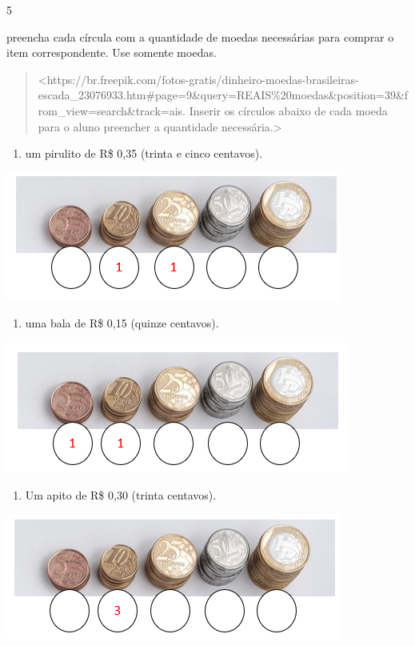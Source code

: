 \num{5}

preencha cada círcula com a quantidade de moedas necessárias para comprar o item correspondente. Use somente moedas.

\begin{quote}
\textless{}https://br.freepik.com/fotos-gratis/dinheiro-moedas-brasileiras-escada\_23076933.htm\#page=9\&query=REAIS\%20moedas\&position=39\&from\_view=search\&track=ais.
Inserir os círculos abaixo de cada moeda para o aluno preencher a
quantidade necessária.\textgreater{}
\end{quote}

\begin{enumerate}
\def\labelenumi{\Alph{enumi})}
\item
  um pirulito de R\$ 0,35 (trinta e cinco centavos).
\end{enumerate}

\includegraphics[width=4.34436in,height=1.66690in]{media/image71.png}

\begin{enumerate}
\def\labelenumi{\Alph{enumi})}
\item
  uma bala de R\$ 0,15 (quinze centavos).
\end{enumerate}

\includegraphics[width=4.41728in,height=1.68774in]{media/image72.png}

\begin{enumerate}
\def\labelenumi{\Alph{enumi})}
\item
  Um apito de R\$ 0,30 (trinta centavos).
\end{enumerate}

\includegraphics[width=4.35477in,height=1.63565in]{media/image73.png}

